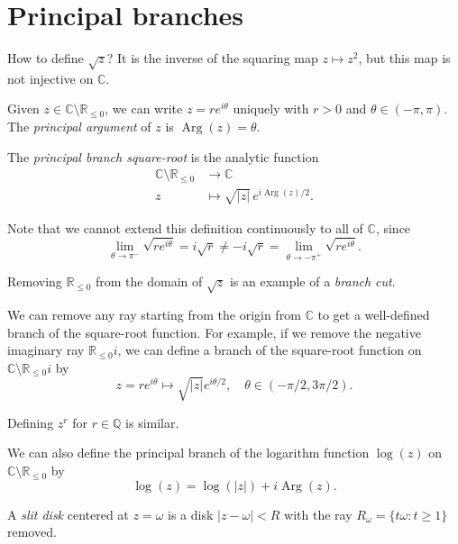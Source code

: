 
\section*{Principal branches}

How to define \(\sqrt{z}\)? It is the inverse of the squaring map \(z \mapsto z^2\), but this map is not injective on \(\mathbb{C}\).

Given \(z \in \mathbb{C} \setminus \mathbb{R}_{\le 0}\), we can write \(z = r e^{i \theta}\) uniquely with \(r > 0\) and \(\theta \in (-\pi, \pi)\).
The \emph{principal argument} of \(z\) is \(\operatorname{Arg}(z) = \theta\).

The \emph{principal branch square-root} is the analytic function
\begin{align*}
    \mathbb{C} \setminus \mathbb{R}_{\le 0} &\longrightarrow \mathbb{C} \\
    z &\mapsto \sqrt{|z|} \, e^{i \operatorname{Arg}(z)/2}.
\end{align*}

Note that we cannot extend this definition continuously to all of \(\mathbb{C}\), since
\[
    \lim_{\theta \to \pi^-} \sqrt{r e^{i \theta}} = i \sqrt{r} \neq -i \sqrt{r} = \lim_{\theta \to -\pi^+} \sqrt{r e^{i \theta}}.
\]

Removing \(\mathbb{R}_{\le 0}\) from the domain of \(\sqrt{z}\) is an example of a \emph{branch cut}.

We can remove any ray starting from the origin from \(\mathbb{C}\) to get a well-defined branch of the square-root function.
For example, if we remove the negative imaginary ray \(\mathbb{R}_{\le 0} i\), we can define a branch of the square-root function on \(\mathbb{C} \setminus \mathbb{R}_{\le 0} i\) by
\[
z = r e^{i \theta} \mapsto \sqrt{|z|} e^{i \theta/2}, \quad \theta \in (-\pi/2, 3\pi/2).
\]

Defining \(z^r\) for \(r \in \mathbb{Q}\) is similar.

We can also define the principal branch of the logarithm function \(\log(z)\) on \(\mathbb{C} \setminus \mathbb{R}_{\le 0}\) by
\[
\log(z) = \log(|z|) + i \operatorname{Arg}(z).
\]

\begin{definition}
    A \emph{slit disk} centered at \(z = \omega\) is a disk \(|z - \omega| < R\) with the ray \(R_\omega = \{t\omega : t \ge 1\}\) removed.
\end{definition}

